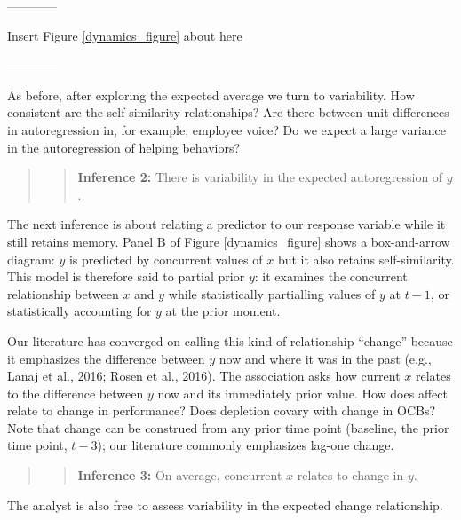 \documentclass[english,,man]{apa6}
\theoremstyle{definition}
\theoremstyle{definition}
\theoremstyle{definition}
\theoremstyle{remark}
\begin{document}
\begin{center}

------------

Insert Figure \ref{dynamics_figure} about here

------------

\end{center}

As before, after exploring the expected average we turn to variability.
How consistent are the self-similarity relationships? Are there
between-unit differences in autoregression in, for example, employee
voice? Do we expect a large variance in the autoregression of helping
behaviors?

\begin{quote}
\begin{quote}
\textbf{Inference 2:} There is variability in the expected
autoregression of \(y\).
\end{quote}
\end{quote}

The next inference is about relating a predictor to our response
variable while it still retains memory. Panel B of Figure
\ref{dynamics_figure} shows a box-and-arrow diagram: \(y\) is predicted
by concurrent values of \(x\) but it also retains self-similarity. This
model is therefore said to partial prior \(y\): it examines the
concurrent relationship between \(x\) and \(y\) while statistically
partialling values of \(y\) at \(t - 1\), or statistically accounting
for \(y\) at the prior moment.

Our literature has converged on calling this kind of relationship
\enquote{change} because it emphasizes the difference between \(y\) now
and where it was in the past (e.g., Lanaj et al., 2016; Rosen et al.,
2016). The association asks how current \(x\) relates to the difference
between \(y\) now and its immediately prior value. How does affect
relate to change in performance? Does depletion covary with change in
OCBs? Note that change can be construed from any prior time point
(baseline, the prior time point, \(t-3\)); our literature commonly
emphasizes lag-one change.

\begin{quote}
\begin{quote}
\textbf{Inference 3:} On average, concurrent \(x\) relates to change in
\(y\).
\end{quote}
\end{quote}

The analyst is also free to assess variability in the expected change
relationship.
\end{document}

